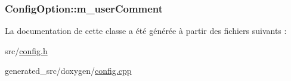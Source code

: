 \subsubsection[{m\+\_\+user\+Comment}]{ Config\+Option\+::m\+\_\+user\+Comment\hspace{0.3cm}{\ttfamily [protected]}}\label{class_config_option_a5e54ead18c124c6c6c03ed3b678a7103}


La documentation de cette classe a été générée à partir des fichiers suivants \+:\begin{DoxyCompactItemize}
\item 
src/\hyperlink{src_2config_8h}{config.\+h}\item 
generated\+\_\+src/doxygen/\hyperlink{config_8cpp}{config.\+cpp}\end{DoxyCompactItemize}
